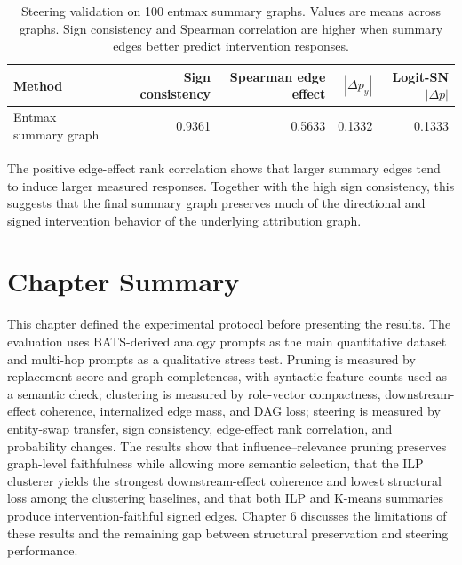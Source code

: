 \documentclass[../main.tex]{subfiles}
\begin{document}
\begin{table}[ht]
\centering
\caption{Steering validation on 100 entmax summary graphs. Values are means
across graphs. Sign consistency and Spearman correlation are higher when
summary edges better predict intervention responses.}
\label{tab:steering-entmax-summary}
\begin{tabular}{lrrrr}
\toprule
Method & Sign consistency & Spearman edge effect & $|\Delta p_y|$ & Logit-SN $|\Delta p|$ \\
\midrule
Entmax summary graph & 0.9361 & 0.5633 & 0.1332 & 0.1333 \\
\bottomrule
\end{tabular}
\end{table}

The positive edge-effect rank correlation shows that larger summary edges tend
to induce larger measured responses. Together with the high sign consistency,
this suggests that the final summary graph preserves much of the directional
and signed intervention behavior of the underlying attribution graph.

\section{Chapter Summary}

This chapter defined the experimental protocol before presenting the results. The
evaluation uses BATS-derived analogy prompts as the main quantitative dataset
and multi-hop prompts as a qualitative stress test. Pruning is measured by
replacement score and graph completeness, with syntactic-feature counts used as
a semantic check; clustering is measured by role-vector compactness,
downstream-effect coherence, internalized edge mass, and DAG loss; steering is
measured by entity-swap transfer, sign consistency, edge-effect rank
correlation, and probability changes. The results show that
influence--relevance pruning preserves graph-level faithfulness while allowing
more semantic selection, that the ILP
clusterer yields the strongest downstream-effect coherence and lowest structural
loss among the clustering baselines, and that both ILP and K-means summaries
produce intervention-faithful signed edges. Chapter 6 discusses the limitations
of these results and the remaining gap between structural preservation and
steering performance.
\end{document}
